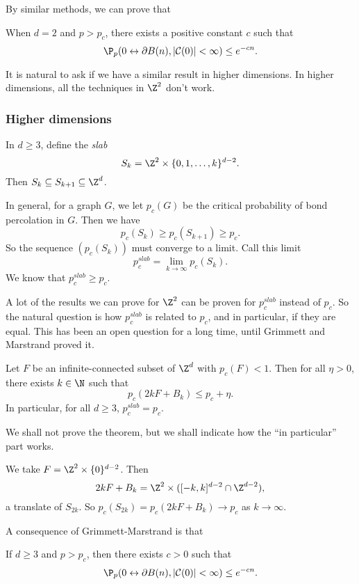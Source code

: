 \documentclass[a4paper]{article}
\begin{document}
By similar methods, we can prove that
\begin{thm}
  When $d = 2$ and $p > p_c$, there exists a positive constant $c$ such that
  \[
    \P_p(0 \leftrightarrow \partial B(n), |\mathcal{C}(0)| < \infty) \leq e^{-cn}.
  \]
\end{thm}

It is natural to ask if we have a similar result in higher dimensions. In higher dimensions, all the techniques in $\Z^2$ don't work.

\subsubsection*{Higher dimensions}

In $d \geq 3$, define the \emph{slab}
\[
  S_k = \Z^2 \times \{0, 1, \ldots, k\}^{d - 2}.
\]
Then $S_k \subseteq S_{k + 1} \subseteq \Z^d$.

In general, for a graph $G$, we let $p_c(G)$ be the critical probability of bond percolation in $G$. Then we have
\[
  p_c(S_k) \geq p_c(S_{k + 1}) \geq p_c.
\]
So the sequence $(p_c(S_k))$ must converge to a limit. Call this limit
\[
  p_c^{slab} = \lim_{k \to \infty} p_c(S_k).
\]
We know that $p_c^{slab} \geq p_c$.

A lot of the results we can prove for $\Z^2$ can be proven for $p_c^{slab}$ instead of $p_c$. So the natural question is how $p_c^{slab}$ is related to $p_c$, and in particular, if they are equal. This has been an open question for a long time, until Grimmett and Marstrand proved it.

\begin{thm}
  Let $F$ be an infinite-connected subset of $\Z^d$ with $p_c(F) < 1$. Then for all $\eta > 0$, there exists $k \in \N$ such that
  \[
    p_c(2k F + B_k) \leq p_c + \eta.
  \]
  In particular, for all $d \geq 3$, $p_c^{slab} = p_c$.
\end{thm}
We shall not prove the theorem, but we shall indicate how the ``in particular'' part works.

We take $F = \Z^2 \times \{0\}^{d - 2}$. Then
\[
  2kF + B_k = \Z^2 \times ([-k, k]^{d - 2} \cap \Z^{d - 2}),
\]
a translate of $S_{2k}$. So $p_c(S_{2k}) = p_c(2kF + B_k) \to p_c$ as $k \to \infty$.

A consequence of Grimmett-Marstrand is that
\begin{thm}
  If $d \geq 3$ and $p > p_c$, then there exists $c > 0$ such that
  \[
    \P_p(0 \leftrightarrow \partial B(n), |\mathcal{C}(0)| < \infty) \leq e^{-cn}.
  \]
\end{thm}
\end{document}

